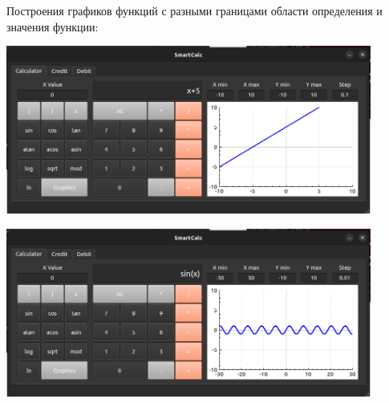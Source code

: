 \documentclass[12pt, letterpaper, twoside]{article}
\begin{document}
	\par Построения графиков функций с разными границами области определения и значения функции:
	\par \includegraphics[width=12cm]{12}
	\par \includegraphics[width=12cm]{13}	
\end{document}

